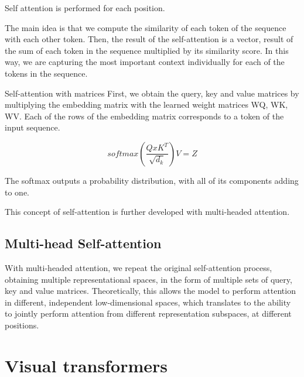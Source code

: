 Self attention is performed for each position.

The main idea is that we compute the similarity of each token of the sequence with each other token. Then, the result of the 
self-attention is a vector, result of the sum of each token in the sequence multiplied by its similarity score. In this
way, we are capturing the most important context individually for each of the tokens in the sequence.


Self-attention with matrices
First, we obtain the query, key and value matrices by multiplying the embedding matrix with the learned weight matrices WQ, WK, WV.
Each of the rows of the embedding matrix corresponds to a token of the input sequence.

$$softmax(\frac{Q x K^T}{\sqrt{d_k}}) V = Z$$

The softmax outputs a probability distribution, with all of its components adding to one.

This concept of self-attention is further developed with multi-headed attention.

\subsection{Multi-head Self-attention}
\label{multihead-self-attention}

With multi-headed attention, we repeat the original self-attention process, obtaining multiple representational spaces, in the form of 
multiple sets of query, key and value matrices. Theoretically, this allows the model to perform attention in different, independent low-dimensional spaces, which
translates to the ability to jointly perform attention from different representation subspaces, at different positions.

\section{Visual transformers}
\label{visual-transformers}


